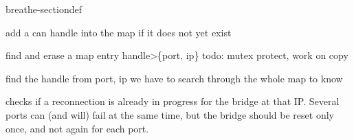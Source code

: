 \documentclass[a4paper,10pt,english]{sphinxmanual}
\begin{document}
\begin{fulllineitems}
\begin{sphinxuseclass}{breathe-sectiondef}
\begin{fulllineitems}
%
\pysigstartmultiline
{}%
\pysigstopmultiline
\sphinxAtStartPar
add a can handle into the map if it does not yet exist 

\end{fulllineitems}



\begin{fulllineitems}
%
\pysigstartmultiline
{}%
\pysigstopmultiline
\sphinxAtStartPar
find and erase a map entry handle\sphinxhyphen{}\textgreater{}\{port, ip\} todo: mutex protect, work on copy 

\end{fulllineitems}



\begin{fulllineitems}
%
\pysigstartmultiline
{}%
\pysigstopmultiline
\sphinxAtStartPar
find the handle from port, ip we have to search through the whole map to know 

\end{fulllineitems}



\begin{fulllineitems}
%
\pysigstartmultiline
{}%
\pysigstopmultiline
\sphinxAtStartPar
checks if a reconnection is already in progress for the bridge at that IP. Several ports can (and will) fail at the same time, but the bridge should be reset only once, and not again for each port. 


\end{fulllineitems}
\end{sphinxuseclass}
\end{fulllineitems}
\end{document}
